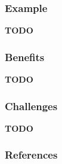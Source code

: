 \documentclass[11pt]{article}
\begin{document}
\subsubsection{Example}

\textbf{TODO}

\subsubsection{Benefits}

\textbf{TODO}

\subsubsection{Challenges}

\textbf{TODO}

\subsubsection{References}



\end{document}

